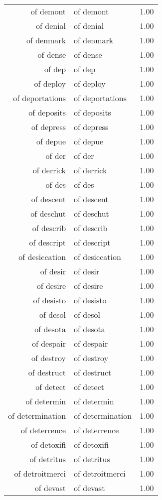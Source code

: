 \begin{table}[ht]
\begin{tabular}{rlr}
  of demont & of demont & 1.00 \\ 
  of denial & of denial & 1.00 \\ 
  of denmark & of denmark & 1.00 \\ 
  of dense & of dense & 1.00 \\ 
  of dep & of dep & 1.00 \\ 
  of deploy & of deploy & 1.00 \\ 
  of deportations & of deportations & 1.00 \\ 
  of deposits & of deposits & 1.00 \\ 
  of depress & of depress & 1.00 \\ 
  of depue & of depue & 1.00 \\ 
  of der & of der & 1.00 \\ 
  of derrick & of derrick & 1.00 \\ 
  of des & of des & 1.00 \\ 
  of descent & of descent & 1.00 \\ 
  of deschut & of deschut & 1.00 \\ 
  of describ & of describ & 1.00 \\ 
  of descript & of descript & 1.00 \\ 
  of desiccation & of desiccation & 1.00 \\ 
  of desir & of desir & 1.00 \\ 
  of desire & of desire & 1.00 \\ 
  of desisto & of desisto & 1.00 \\ 
  of desol & of desol & 1.00 \\ 
  of desota & of desota & 1.00 \\ 
  of despair & of despair & 1.00 \\ 
  of destroy & of destroy & 1.00 \\ 
  of destruct & of destruct & 1.00 \\ 
  of detect & of detect & 1.00 \\ 
  of determin & of determin & 1.00 \\ 
  of determination & of determination & 1.00 \\ 
  of deterrence & of deterrence & 1.00 \\ 
  of detoxifi & of detoxifi & 1.00 \\ 
  of detritus & of detritus & 1.00 \\ 
  of detroitmerci & of detroitmerci & 1.00 \\ 
  of devast & of devast & 1.00 \\ 

\end{tabular}
\end{table}
